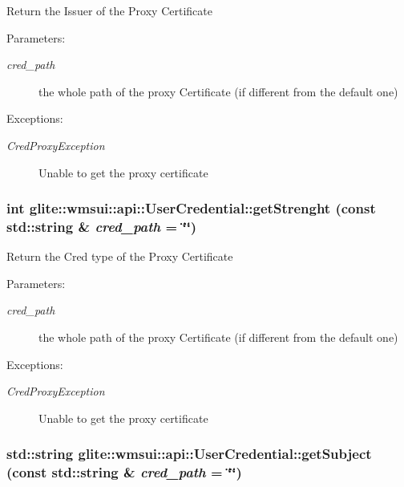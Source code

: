 Return the Issuer of the Proxy Certificate \begin{Desc}
\item[Parameters:]
\begin{description}
\item[{\em cred\_\-path}]the whole path of the proxy Certificate (if different from the default one) \end{description}
\end{Desc}
\begin{Desc}
\item[Exceptions:]
\begin{description}
\item[{\em Cred\-Proxy\-Exception}]Unable to get the proxy certificate\end{description}
\end{Desc}
\hypertarget{classglite_1_1wmsui_1_1api_1_1UserCredential_a5}{
\subsubsection[getStrenght]{\setlength{\rightskip}{0pt plus 5cm}int glite::wmsui::api::User\-Credential::get\-Strenght (const std::string \& {\em cred\_\-path} = \char`\"{}\char`\"{})}}
\label{classglite_1_1wmsui_1_1api_1_1UserCredential_a5}


Return the Cred type of the Proxy Certificate \begin{Desc}
\item[Parameters:]
\begin{description}
\item[{\em cred\_\-path}]the whole path of the proxy Certificate (if different from the default one) \end{description}
\end{Desc}
\begin{Desc}
\item[Exceptions:]
\begin{description}
\item[{\em Cred\-Proxy\-Exception}]Unable to get the proxy certificate\end{description}
\end{Desc}
\hypertarget{classglite_1_1wmsui_1_1api_1_1UserCredential_a3}{
\subsubsection[getSubject]{\setlength{\rightskip}{0pt plus 5cm}std::string glite::wmsui::api::User\-Credential::get\-Subject (const std::string \& {\em cred\_\-path} = \char`\"{}\char`\"{})}}
\label{classglite_1_1wmsui_1_1api_1_1UserCredential_a3}


